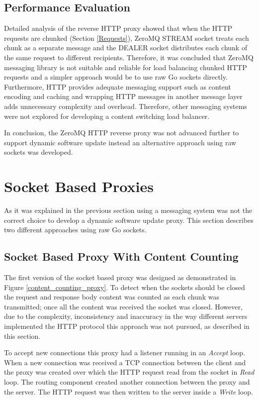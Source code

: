 \documentclass[a4paper,11pt,twoside]{report}
\begin{document}
\subsection{Performance Evaluation}
Detailed analysis of the reverse HTTP proxy showed that when the HTTP requests are chunked (Section \ref{Requests}), ZeroMQ STREAM socket treats each chunk as a separate message and the DEALER socket distributes each chunk of the same request to different recipients. Therefore, it was concluded that ZeroMQ messaging library is not suitable and reliable for load balancing chunked HTTP requests and a simpler approach would be to use raw Go sockets directly. Furthermore, HTTP provides adequate messaging support such as content encoding and caching and wrapping HTTP messages in another message layer adds unnecessary complexity and overhead. Therefore, other messaging systems were not explored for developing a content switching load balancer. 

In conclusion, the ZeroMQ HTTP reverse proxy was not advanced further to support dynamic software update instead an alternative approach using raw sockets was developed. 

\section{Socket Based Proxies}
As it was explained in the previous section using a messaging system was not the correct choice to develop a dynamic software update proxy. This section describes two different approaches using raw Go sockets.   

\subsection{Socket Based Proxy With Content Counting}\label{Content-Counting}
The first version of the socket based proxy was designed as demonstrated in Figure \ref{content_counting_proxy}. To detect when the sockets should be closed the request and response body content was counted as each chunk was transmitted; once all the content was received the socket was closed.  However, due to the complexity, inconsistency and inaccuracy in the way different servers implemented the HTTP protocol this approach was not pursued, as described in this section.

To accept new connections this proxy had a listener running in an  \textit{Accept} loop.  When a new connection was received a TCP connection between the client and the proxy was created over which the HTTP request read from the socket in \textit{Read} loop.  The routing component created another connection between the proxy and the server.  The HTTP request was then written to the server inside a \textit{Write} loop.
\end{document}
